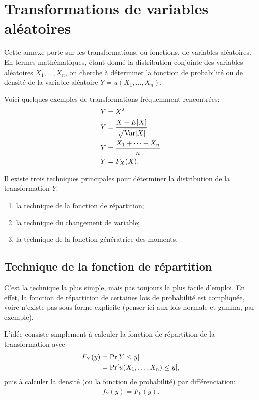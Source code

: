 
\chapter{Transformations de variables aléatoires}
\label{chap:rappels_transformations}

Cette annexe porte sur les transformations, ou fonctions, de variables
aléatoires. En termes mathématiques, étant donné la distribution
conjointe des variables aléatoires $X_1, \dots, X_n$, on cherche à
déterminer la fonction de probabilité ou de densité de la variable
aléatoire $Y = u(X_1, \dots, X_n)$.

Voici quelques exemples de transformations fréquemment rencontrées:
\begin{align*}
  Y &= X^2 \\
  Y &= \frac{X - E [ X ]}{\sqrt{\operatorname{Var} [ X ]}} \\
  Y &= \frac{X_1 + \dots + X_n}{n} \\
  Y &= F_X(X).
\end{align*}

Il existe trois techniques principales pour déterminer la distribution
de la transformation $Y$:
\begin{enumerate}
\item la technique de la fonction de répartition;
\item la technique du changement de variable;
\item la technique de la fonction génératrice des moments.
\end{enumerate}


\section{Technique de la fonction de répartition}

C'est la technique la plus simple, mais pas toujours la plus facile
d'emploi. En effet, la fonction de répartition de certaines lois de
probabilité est compliquée, voire n'existe pas sous forme explicite
(penser ici aux lois normale et gamma, par exemple).

L'idée consiste simplement à calculer la fonction de répartition de la
transformation avec
\begin{align*}
  F_Y(y)
  &= \operatorname{Pr} [ Y \leq y ] \\
  &= \operatorname{Pr} [ u(X_1, \dots, X_n) \leq y ],
\end{align*}
puis à calculer la densité (ou la fonction de probabilité) par
différenciation:
\begin{displaymath}
  f_Y(y) = F_Y^\prime(y).
\end{displaymath}


